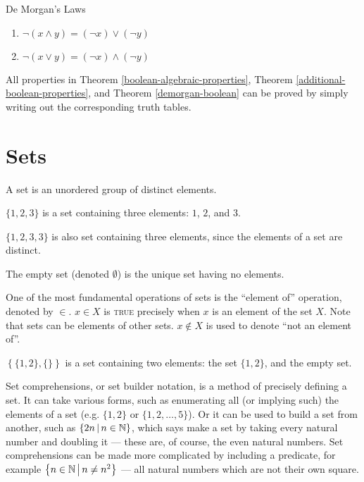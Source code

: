 \begin{thm}{De Morgan's Laws}\label{demorgan-boolean}\proofbreak
    \begin{enumerate}
        \item $\neg(x \land y) = (\neg x) \lor (\neg y)$
        \item $\neg(x \lor y) = (\neg x) \land (\neg y)$
    \end{enumerate}
\end{thm}

\begin{rmk}
    All properties in Theorem \ref{boolean-algebraic-properties}, Theorem \ref{additional-boolean-properties}, and Theorem \ref{demorgan-boolean} can be proved by simply writing out the corresponding truth tables.
\end{rmk}

\section{Sets}

\begin{defn}\label{set}
    A set is an unordered group of distinct elements.
\end{defn}

\begin{exmp}
    $\{1, 2, 3\}$ is a set containing three elements: $1$, $2$, and $3$.
\end{exmp}

\begin{rmk}
    $\{1, 2, 3, 3\}$ is also set containing three elements, since the elements of a set are distinct.
\end{rmk}

\begin{defn}\label{empty-set}
    The empty set (denoted $\emptyset$) is the unique set having no elements.
\end{defn}

One of the most fundamental operations of sets is the ``element of'' operation, denoted by $\in$. $x \in X$ is \textsc{true} precisely when $x$ is an element of the set $X$. Note that sets can be elements of other sets. $x \notin X$ is used to denote ``not an element of''.

\begin{exmp}
    $\left\{\{1, 2\}, \{\}\right\}$ is a set containing two elements: the set $\{1, 2\}$, and the empty set.
\end{exmp}

Set comprehensions, or set builder notation, is a method of precisely defining a set. It can take various forms, such as enumerating all (or implying such) the elements of a set (e.g. $\{1, 2\}$ or $\{1, 2, \ldots, 5\}$). Or it can be used to build a set from another, such as $\left\{2n \,\middle|\, n \in \mathbb{N}\right\}$, which says make a set by taking every natural number and doubling it --- these are, of course, the even natural numbers. Set comprehensions can be made more complicated by including a predicate, for example $\left\{n \in \mathbb{N} \,\middle|\, n \neq n^2 \right\}$ --- all natural numbers which are not their own square.


